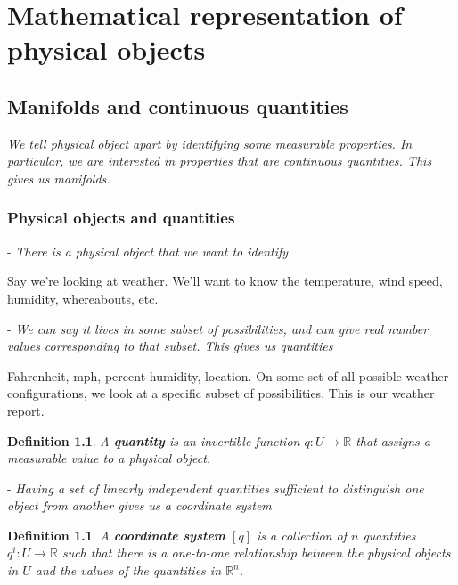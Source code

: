 \documentclass{book}
\newtheorem{defn}[equation]{Definition}
\begin{document}
\tableofcontents

\chapter{Mathematical representation of physical objects}



\section{Manifolds and continuous quantities}
\emph{We tell physical object apart by identifying some measurable properties. In particular, we are interested in properties that are continuous quantities. This gives us manifolds.}

\subsection{Physical objects and quantities}

- \emph{There is a physical object that we want to identify}

Say we're looking at weather. We'll want to know the temperature, wind speed, humidity, whereabouts, etc.

- \emph{We can say it lives in some subset of possibilities, and can give real number values corresponding to that subset. This gives us quantities}

Fahrenheit, mph, percent humidity, location.
On some set of all possible weather configurations, we look at a specific subset of possibilities. This is our weather report.  






\begin{defn}
	A \textbf{quantity} is an invertible function $q : U \to \mathbb{R}$ that assigns a measurable value to a physical object.
\end{defn}


- \emph{Having a set of linearly independent quantities sufficient to distinguish one object from another gives us a coordinate system}




\begin{defn}
	A \textbf{coordinate system} $[q]$ is a collection of $n$ quantities $q^i : U \to \mathbb{R}$ such that there is a one-to-one relationship between the physical objects in $U$ and the values of the quantities in $\mathbb{R}^n$.
\end{defn}
\end{document}
